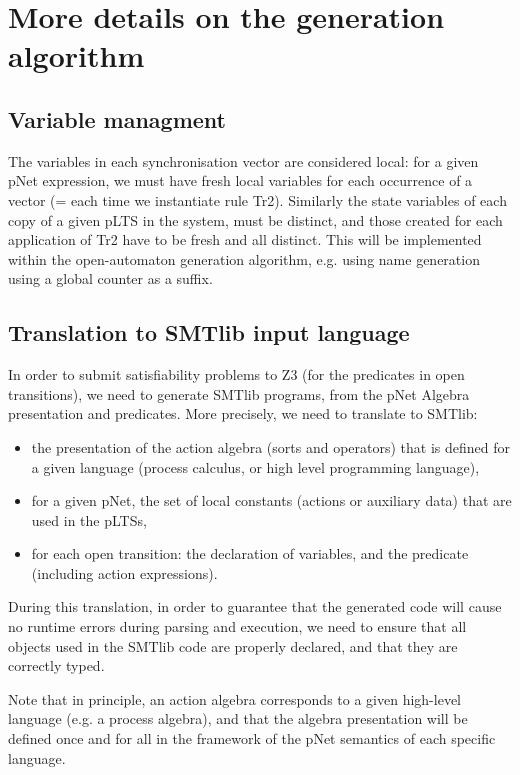 \documentclass{lncs/llncs}
\begin{document}
\section{More details on the generation algorithm}



\subsection{Variable managment}
The variables in each synchronisation vector are considered local: for a given pNet expression, we must have fresh local variables for each occurrence of a vector (= each time we instantiate rule Tr2). Similarly the state variables of each copy of a given pLTS in the system, must be distinct, and those created for each application of Tr2 have to be fresh and all distinct. This will be implemented within the open-automaton generation algorithm, e.g. using name generation using a global counter as a suffix.

\subsection{Translation to SMTlib input language}
In order to submit satisfiability problems to Z3 (for the predicates
in open transitions), we need to generate SMTlib programs, from the
pNet Algebra presentation and predicates.
More precisely, we need to translate to SMTlib:
\begin{itemize}
  \item the presentation of the action algebra
    (sorts and operators) that is defined for a given language (process calculus, or high level programming language),
    \item for a given pNet, the set of local constants (actions or auxiliary data) that are used in the pLTSs,
    \item for each open transition: the declaration of variables, and
      the predicate (including action expressions).
\end{itemize}

During this translation, in order to guarantee that the generated code
will cause no runtime errors during parsing and execution, we need
to ensure that all objects used in the SMTlib code are properly
declared, and that they are correctly typed.

Note that in principle, an action algebra corresponds to a given
high-level language (e.g. a process algebra), and that the algebra
presentation will be defined once and for all in the framework of the
pNet semantics of each specific language.
\end{document}
